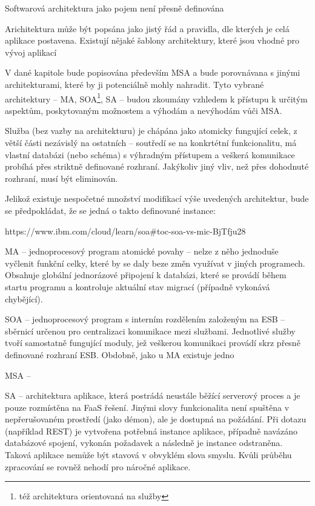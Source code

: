 

Softwarová architektura jako pojem není přesně definována \cite{softarch}

Arichitektura může být popsána jako jistý řád a pravidla, dle kterých je celá aplikace postavena.
Existují nějaké šablony architektury, které jsou vhodné pro vývoj aplikací


V dané kapitole bude popisována především \gls{MSA} a bude porovnávana s jinými architekturami, které by ji potenciálně mohly nahradit.
Tyto vybrané architektury – \gls{MA}, \gls{SOA}\footnote{též architektura orientovaná na služby}, \gls{SA} – budou zkoumány vzhledem k přístupu k určitým aspektům, poskytovaným možnostem a výhodám a nevýhodám vůči \gls{MSA}.



Služba (bez vazby na architekturu) je chápána jako atomicky fungující celek, z větší části nezávislý na ostatních – soutředí se na konkrtétní funkcionalitu, má vlastní databázi (nebo schéma) s výhradným přístupem a veškerá komunikace probíhá přes striktně definované rozhraní.
Jakýkoliv jiný vliv, než přes dohodnuté rozhraní, musí být eliminován.

Jelikož existuje nespočetné množství modifikací výše uvedených architektur, bude se předpokládat, že se jedná o takto definované instance:


https://www.ibm.com/cloud/learn/soa#toc-soa-vs-mic-BjTfju28

\begin{dl}
   \item[\gls{MA}] – jednoprocesový program atomické povahy – nelze z něho jednoduše vyčlenit funkční celky, které by se daly beze změn využívat v jiných programech.
   Obsahuje globální jednorázové připojení k databázi, které se provádí během startu programu a kontroluje aktuální stav migrací (případně vykonává chybějící).
   \item[\gls{SOA}] – jednoprocesový program s interním rozdělením založeným na \gls{ESB} – sběrnicí určenou pro centralizaci komunikace mezi službami.
   Jednotlivé služby tvoří samostatně fungující moduly, jež veškerou komunikaci provádí skrz přesně definované rozhraní \gls{ESB}.
   Obdobně, jako u \gls{MA} existuje jedno
   \item[\gls{MSA}] –
   \item[\gls{SA}] – architektura aplikace, která postrádá neustále běžící serverový proces a je pouze rozmístěna na \gls{FaaS} řešení.
   Jinými slovy funkcionalita není spuštěna v nepřerušovaném prostředí (jako démon), ale je dostupná na požádání.
   Při dotazu (například REST) je vytvořena potřebná instance aplikace, případně navázáno databázové spojení, vykonán požadavek a následně je instance odstraněna.
   Taková aplikace nemůže být stavová v obvyklém slova smyslu.
   Kvůli průběhu zpracování se rovněž nehodí pro náročné aplikace. 
\end{dl}

